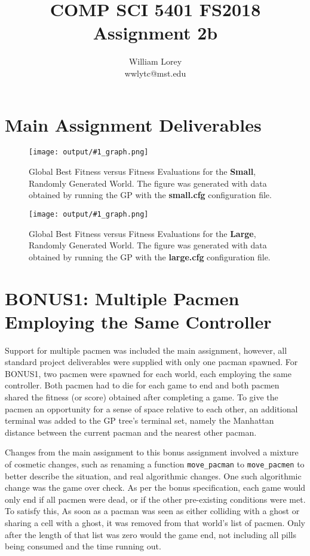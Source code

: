 \documentclass[11pt]{article}
\title{COMP SCI 5401 FS2018 Assignment 2b}
\author{William  Lorey \\ wwlytc@mst.edu}
\date{}
\newcommand{\fitnessplotcaption}[2]{\caption{Global Best Fitness versus Fitness Evaluations for the \textbf{{#1}}, Randomly Generated World. The figure was generated with data obtained by running the GP with the \textbf{{#2}} configuration file.}}
\newcommand{\addgraphic}[1]{\centerline{\texttt{[image: output/\#1\_graph.png]}}}
\begin{document}
\maketitle

\tableofcontents

\section{Main Assignment Deliverables}

\begin{figure}[H]
    \addgraphic{small}
    \fitnessplotcaption{Small}{small.cfg}
    \label{fig:small}
\end{figure}

\begin{figure}[H]
    \addgraphic{large}
    \fitnessplotcaption{Large}{large.cfg}
    \label{fig:large}
\end{figure}


\section{BONUS1: Multiple Pacmen Employing the Same Controller}

Support for multiple pacmen was included the main assignment, however, all standard project 
deliverables were supplied with only one pacman spawned. For BONUS1, two pacmen were
spawned for each world, each employing the same controller. Both pacmen had to die
for each game to end and both pacmen shared the fitness (or score) obtained after
completing a game. To give the pacmen an opportunity for a sense of space relative to each other, 
an additional terminal was 
added to the GP tree's terminal set, namely the Manhattan distance between the 
current pacman and the nearest other pacman.

Changes from the main assignment to this bonus assignment involved a mixture of 
cosmetic changes, such as renaming a function \texttt{move\_pacman} to \texttt{move\_pacmen}
to better describe the situation, and real algorithmic changes. One such algorithmic
change was the game over check. As per the bonus specification, each game would
only end if all pacmen were dead, or if the other pre-existing conditions were met. 
To satisfy this, As soon as a pacman was seen as
either colliding with a ghost or sharing a cell with a ghost, it was removed from
that world's list of pacmen. Only after the length of that list was zero would the game
end, not including all pills being consumed and the time running out.
\end{document}
